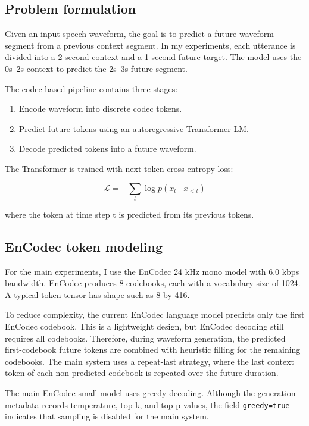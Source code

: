 \documentclass{article}
\begin{document}
	\subsection{Problem formulation}
	
	Given an input speech waveform, the goal is to predict a future waveform segment from a previous context segment. In my experiments, each utterance is divided into a 2-second context and a 1-second future target. The model uses the 0s--2s context to predict the 2s--3s future segment.
	
	The codec-based pipeline contains three stages:
	
	\begin{enumerate}
		\item Encode waveform into discrete codec tokens.
		\item Predict future tokens using an autoregressive Transformer LM.
		\item Decode predicted tokens into a future waveform.
	\end{enumerate}
	
	The Transformer is trained with next-token cross-entropy loss:
	
	$$
	\mathcal{L} = - \sum_t \log p(x_t \mid x_{<t})
	$$
	
	where the token at time step t is predicted from its previous tokens.
	
	\subsection{EnCodec token modeling}
	
	For the main experiments, I use the EnCodec 24 kHz mono model with 6.0 kbps bandwidth. EnCodec produces 8 codebooks, each with a vocabulary size of 1024. A typical token tensor has shape such as 8 by 416.
	
	To reduce complexity, the current EnCodec language model predicts only the first EnCodec codebook. This is a lightweight design, but EnCodec decoding still requires all codebooks. Therefore, during waveform generation, the predicted first-codebook future tokens are combined with heuristic filling for the remaining codebooks. The main system uses a repeat-last strategy, where the last context token of each non-predicted codebook is repeated over the future duration.
	
	The main EnCodec small model uses greedy decoding. Although the generation metadata records temperature, top-k, and top-p values, the field \texttt{greedy=true} indicates that sampling is disabled for the main system.
	
\end{document}
